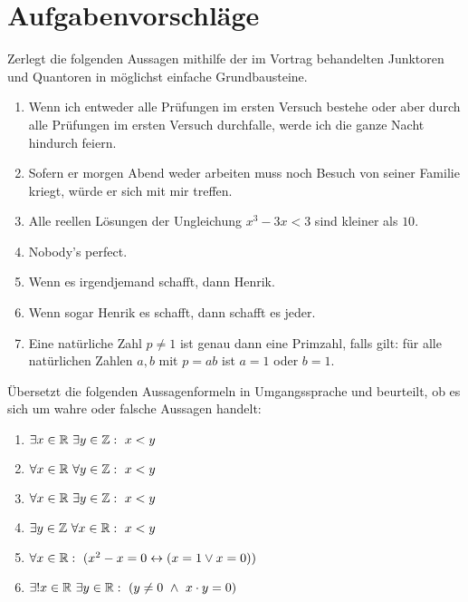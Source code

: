 \clearpage
\section{Aufgabenvorschläge}


\begin{aufg}
    Zerlegt die folgenden Aussagen mithilfe der im Vortrag behandelten Junktoren und Quantoren in möglichst einfache Grundbausteine.
    \begin{enumerate}
        \item Wenn ich entweder alle Prüfungen im ersten Versuch bestehe oder aber durch alle Prüfungen im ersten Versuch durchfalle, werde ich die ganze Nacht hindurch feiern.
        \item Sofern er morgen Abend weder arbeiten muss noch Besuch von seiner Familie kriegt, würde er sich mit mir treffen.
        \item Alle reellen Lösungen der Ungleichung $x^3-3x<3$ sind kleiner als $10$.
        \item Nobody’s perfect.
        \item Wenn es irgendjemand schafft, dann Henrik.
        \item Wenn sogar Henrik es schafft, dann schafft es jeder.
        \item Eine natürliche Zahl $p\neq 1$ ist genau dann eine Primzahl, falls gilt: für alle natürlichen Zahlen $a,b$ mit $p=ab$ ist $a=1$ oder $b=1$.
    \end{enumerate}
\end{aufg}


\begin{aufg}
    Übersetzt die folgenden Aussagenformeln in Umgangssprache und beurteilt, ob es sich um wahre oder falsche Aussagen handelt:
    \begin{enumerate}
        \item $\exists x\in \R\ \exists y\in \Z:\ x<y$
        \item $\forall x\in \R\ \forall y\in \Z:\ x<y$
        \item $\forall x\in \R\ \exists y\in \Z:\ x<y$
        \item $\exists y\in \Z\ \forall x\in \R:\ x<y$
        \item $\forall x\in \mathbb R:\ (x^2 -x=0\leftrightarrow(x=1\vee x=0))$
        \item $\exists! x\in \R\ \exists y\in \R:\ (y\neq0\ \land\ x\cdot y=0)$
    \end{enumerate}
\end{aufg}
	

